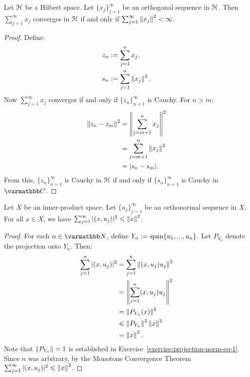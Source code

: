 \begin{theorem}
    Let $\mathcal{H}$ be a Hilbert space. Let $\{x_j\}_{j = 1}^\infty$ be an orthogonal sequence in $\mathcal{H}$. Then $\sum_{j = 1}^\infty x_j$ converges in $\mathcal{H}$ if and only if $\sum_{j = 1}^\infty \left\lVert x_j \right\rVert^2 < \infty$. 
\end{theorem}
    \begin{proof}
        Define:
            \begin{equation*}
            \begin{split}
                z_n &:= \sum_{j = 1}^n x_j, \\
                s_n &:= \sum_{j = 1}^n \left\lVert x_j \right\rVert^2.
            \end{split}
            \end{equation*}
        Now $\sum_{j = 1}^\infty x_j$ converges if and only if $\{z_n\}_{n = 1}^\infty$ is Cauchy. For $n > m$:
            \begin{equation*}
            \begin{split}
                \left\lVert z_n - z_m \right\rVert^2 
                & = \left\lVert \sum_{j = m+1}^n x_j \right\rVert^2 \\
                & = \sum_{j = m+1}^n \left\lVert x_j \right\rVert^2 \\
                & = |s_n - s_m|.
            \end{split}
            \end{equation*}
        From this, $\{z_n\}_{n = 1}^\infty$ is Cauchy in $\mathcal{H}$ if and only if $\{s_n\}_{n = 1}^\infty$ is Cauchy in $\bfC$.
    \end{proof}

\begin{theorem}\label{thm:bessels-ineq}
    Let $X$ be an inner-product space. Let $\{u_j\}_{j =1}^\infty$ be an orthonormal sequence in $X$. For all $x \in X$, we have $\sum_{j = 1}^\infty |(x,u_j)|^2 \leqslant \left\lVert x \right\rVert^2$.
\end{theorem}
    \begin{proof}
        For each $n \in \bfN$, define $Y_n := \operatorname{span} \{u_1,...,u_n\}$. Let $P_{Y_n}$ denote the projection onto $Y_n$. Then:
            \begin{equation*}
            \begin{split}
                \sum_{j = 1}^n |(x,u_j)|^2
                & = \sum_{j = 1}^n \left\lVert (x,u_j) u_j \right\rVert^2 \\
                & = \left\lVert \sum_{j = 1}^n (x,u_j)u_j \right\rVert^2 \\
                & = \left\lVert P_{Y_n}(x) \right\rVert^2 \\
                & \leqslant \left\lVert P_{Y_n} \right\rVert^2 \left\lVert x \right\rVert^2 \\
                & = \left\lVert x \right\rVert^2.
            \end{split}
            \end{equation*}
        Note that $\left\lVert P_{Y_n} \right\rVert = 1$ is established in Exercise~\ref{exercise:projection-norm-eq-1}. Since $n$ was arbitrary, by the Monotone Convergence Theorem $\sum_{j = 1}^\infty |(x,u_j)|^2 \leqslant \left\lVert x \right\rVert^2$.
    \end{proof}

